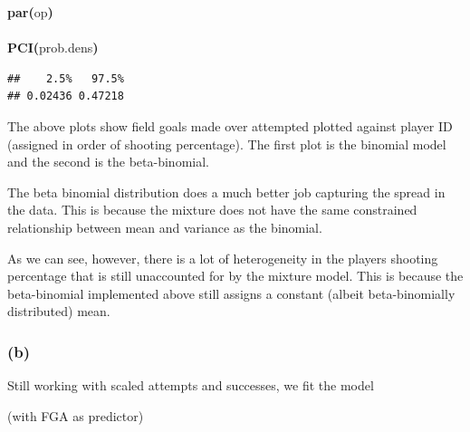 \documentclass{article}
\makeatletter
\newcommand{\hlfunctioncall}[1]{\textcolor[rgb]{.5,0,.33}{\textbf{#1}}}%
\newcommand{\hlkeyword}[1]{\textbf{#1}}%
\newcommand{\hlsymbol}[1]{#1}%
\newcommand{\hlstd}[1]{\textcolor[rgb]{0,0,0}{#1}}%
\newenvironment{kframe}{%
 \def\FrameCommand##1{\hskip\@totalleftmargin \hskip-\fboxsep
 \colorbox{shadecolor}{##1}\hskip-\fboxsep
     \hskip-\linewidth \hskip-\@totalleftmargin \hskip\columnwidth}%
 \MakeFramed {\advance\hsize-\width
   \@totalleftmargin\z@ \linewidth\hsize
   \@setminipage}}%
 {\par\unskip\endMakeFramed}
\newenvironment{knitrout}{}{} %
\makeatother
\begin{document}
\begin{knitrout}
{\begin{kframe}
\begin{flushleft}
\ttfamily\noindent
\hlfunctioncall{par}\hlkeyword{(}\hlsymbol{op}\hlkeyword{)}\hspace*{\fill}\\
\hlstd{}\hspace*{\fill}\\
\hlstd{}\hlfunctioncall{PCI}\hlkeyword{(}\hlsymbol{prob.dens}\hlkeyword{)}\mbox{}
\normalfont
\end{flushleft}
\begin{verbatim}
##    2.5%   97.5% 
## 0.02436 0.47218 
\end{verbatim}
\end{kframe}}
\end{knitrout}


The above plots show field goals made over attempted plotted against player ID (assigned in order of shooting percentage). 
The first plot is the binomial model and the second is the beta-binomial.

The beta binomial distribution does a much better job capturing the spread in the data. 
This is because the mixture does not have the same constrained relationship between mean and variance as the binomial.

As we can see, however, there is a lot of heterogeneity in the players shooting percentage that is still unaccounted for by the mixture model. 
This is because the beta-binomial implemented above still assigns a constant (albeit beta-binomially distributed) mean. 

\subsubsection{(b)}

Still working with scaled attempts and successes, we fit the model 

(with FGA as predictor)
\end{document}
